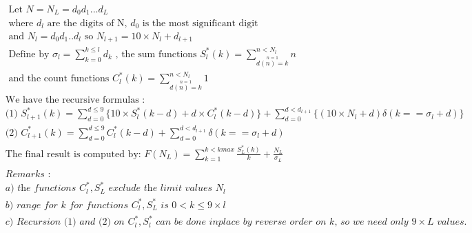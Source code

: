 \documentclass[10pt,a4paper]{letter}
\begin{document}
\begin{align*}
	&\text{ Let }N=N_{L}=d_{0}d_{1}...d_{L}\\
	&\text{ where }d_{l}\text{ are the digits of N, }d_{0}\text{ is the most significant digit}\\
	&\text{ and } N_{l}=d_{0}d_{1}..d_{l}\text{ so }N_{l+1}=10 \times N_{l}+d_{l+1}\\
&\text{ Define by }\sigma_{l}=\sum_{k=0}^{k\leq l}d_{k}\text{ ,}
\text{ the sum functions }S_{l}^{*}(k)=\sum_{\stackrel{n=1}{d(n)=k}}^{n < N_{l}}n\\
&\text{ and the count functions }C_{l}^{*}(k)=\sum_{\stackrel{n=1}{d(n)=k}}^{n < N_{l}}1\\
&\text{We have the recursive formulas : }\\
&\text{(1) }S_{l+1}^{*}(k)=\sum_{d=0}^{d\leq 9}\{10 \times S_{l}^{*}(k-d)+d \times C_{l}^{*}(k-d)\} 
+ \sum_{d=0}^{d < d_{l+1}}\{(10 \times N_{l}+d)\delta(k==\sigma_{l}+d)\}\\
&\text{(2) }C_{l+1}^{*}(k)=\sum_{d=0}^{d\leq 9}C_{l}^{*}(k-d)
+ \sum_{d=0}^{d < d_{l+1}}\delta(k==\sigma_{l}+d)\\
&\text{The final result is computed by: }
F(N_{L})=\sum_{k=1}^{k < kmax}\frac{S_{L}^{*}(k)}{k}+\frac{N_{L}}{\sigma_{L}}\\
\end{align*}
\begin{align*}
&\textit{Remarks :}\\
&\textit{a) the functions }C_{l}^{*},S_{L}^{*}\textit{ exclude the limit values }N_{l}\\
	&\textit{b) range for k for functions }C_{l}^{*},S_{L}^{*} \textit{ is } 0< k \leq 9\times l\\
	&\textit{c) Recursion (1) and (2) on }C_{l}^{*},S_{l}^{*}\textit{ can be done inplace by reverse order on k, so we need only }9\times L \textit{ values.}\\
\end{align*}
\end{document}
